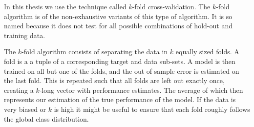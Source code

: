 In this thesis we use the technique called $k$-fold cross-validation. The $k$-fold algorithm is of the non-exhaustive variants of this type of algorithm. It is so named because it does not test for all possible combinations of hold-out and training data. 

The $k$-fold algorithm consists of separating the data in $k$ equally sized folds. A fold is a a tuple of a corresponding target and data sub-sets. A model is then trained on all but one of the folds, and the out of sample error is estimated on the last fold. This is repeated such that all folds are left out exactly once, creating a $k$-long vector with performance estimates. The average of which then represents our estimation of the true performance of the model. If the data is very biased or $k$ is high it might be useful to ensure that each fold roughly follows the global class distribution. 